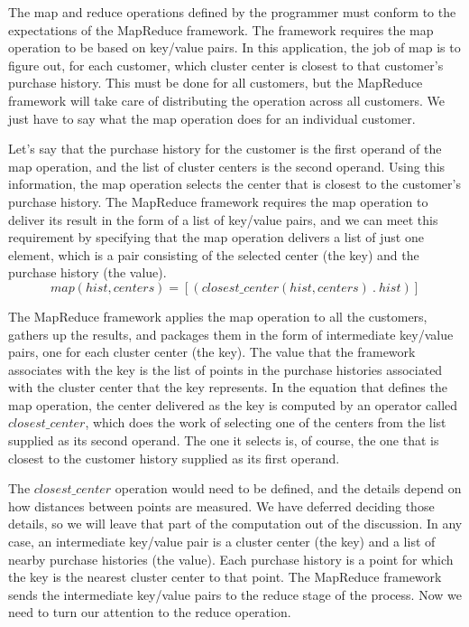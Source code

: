 The map and reduce operations defined by the programmer
must conform to the expectations of the MapReduce framework.
The framework requires the map operation to be based on
key/value pairs.  In this application, the job of map is
to figure out, for each customer, which cluster center
is closest to that customer's purchase history.
This must be done for all customers, but the MapReduce
framework will take care of distributing the operation across all customers.
We just have to say what the map operation does for an individual customer.

Let's say that the purchase history for the customer is the first operand
of the map operation, and the list of cluster centers is the second operand.
Using this information, the map operation selects the center that is closest
to the customer's purchase history. The MapReduce framework requires the map
operation to deliver its result in the form of a list of key/value pairs,
and we can meet this requirement by specifying that the map operation
delivers a list of just one element, which is a pair consisting of
the selected center (the key) and the purchase history (the value).
\begin{displaymath}
map(hist, centers) = [ ( closest\_center(hist, centers) ~.~ hist ) ]
\end{displaymath}

The MapReduce framework applies the map operation to all the customers,
gathers up the results, and packages them in the form of
intermediate key/value pairs, one for each cluster center (the key).
The value that the framework associates with the key is the list of
points in the purchase histories associated with the cluster center that
the key represents.
In the equation that defines the map operation,
the center delivered as the key is computed by an operator
called $closest\_center$, which does the work of selecting one
of the centers from the list supplied as its second operand.
The one it selects is, of course, the one that is closest to
the customer history supplied as its first operand.

The $closest\_center$ operation would need to be defined,
and the details depend on how distances between
points are measured. We have deferred deciding those
details, so we will leave that part of the computation
out of the discussion.
In any case, an intermediate key/value pair is a cluster center
(the key) and a list of nearby purchase histories
(the value). Each purchase history is a point for which the
key is the nearest cluster center to that point.
The MapReduce framework sends the intermediate key/value pairs
to the reduce stage of the process.
Now we need to turn our attention to the reduce operation.

